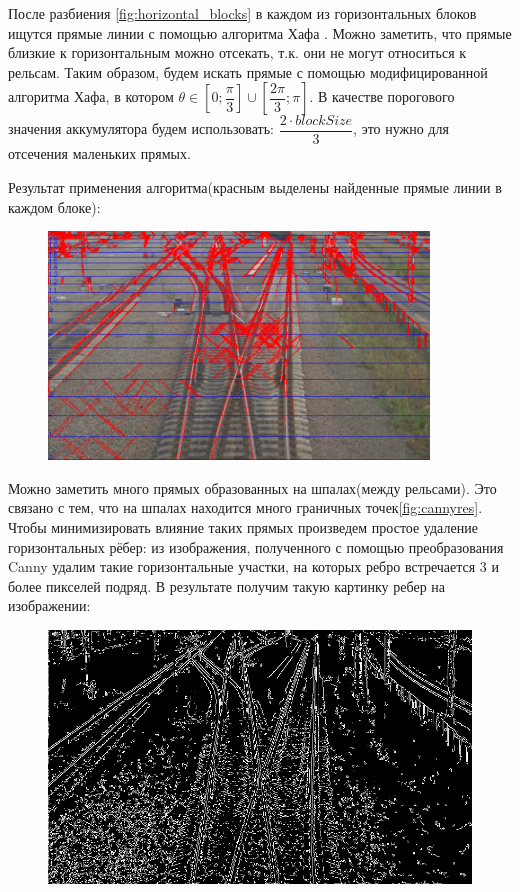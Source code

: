 После разбиения \ref{fig:horizontal_blocks} в каждом из горизонтальных блоков ищутся прямые линии с помощью алгоритма Хафа \cite{b:hough_transform}. Можно заметить, что прямые близкие к горизонтальным можно отсекать, т.к. они не могут относиться к рельсам. Таким образом, будем искать прямые с помощью модифицированной алгоритма Хафа, в котором $\theta \in [0;\dfrac{\pi}{3}] \cup [\dfrac{2\pi}{3};\pi]$. В качестве порогового значения аккумулятора будем использовать: $\dfrac{2\cdot blockSize}{3}$, это нужно для отсечения маленьких прямых.

Результат применения алгоритма(красным выделены найденные прямые линии в каждом блоке):
\begin{figure}[!h]
	\centering
	\includegraphics[width=0.9\textwidth]{pictures/hough_lines_res}
	\caption[Результат применения алгоритма]{}
	\label{fig:houghlinesres}
\end{figure}

\newpage
Можно заметить много прямых образованных на шпалах(между рельсами). Это связано с тем, что на шпалах находится много граничных точек\ref{fig:cannyres}. 
Чтобы минимизировать влияние таких прямых произведем простое удаление горизонтальных рёбер: из изображения, полученного с помощью преобразования Canny удалим такие горизонтальные участки, на которых ребро встречается 3 и более пикселей подряд.
В результате получим такую картинку ребер на изображении:
\begin{figure}[!h]
	\centering
	\includegraphics[width=0.9\linewidth]{pictures/screenshot0014}
	\caption{}
	\label{fig:canny_remove_horizontal}
\end{figure}

